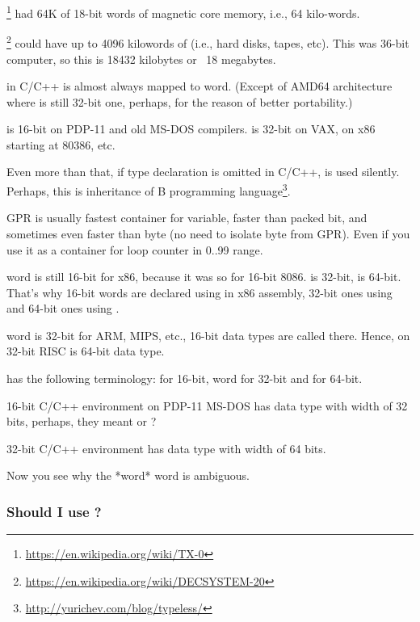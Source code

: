 \footnote{\url{https://en.wikipedia.org/wiki/TX-0}} had 64K of 18-bit words of magnetic core memory,
i.e., 64 kilo-words.

\footnote{\url{https://en.wikipedia.org/wiki/DECSYSTEM-20}}
could have up to 4096 kilowords of 
(i.e., hard disks, tapes, etc).
This was 36-bit computer, so this is 18432 kilobytes or ~18 megabytes.

\myhrule{}

 in C/C++ is almost always mapped to \gls{word}.
(Except of AMD64 architecture where  is still 32-bit one, perhaps, for the reason of better portability.)

 is 16-bit on PDP-11 and old MS-DOS compilers.
 is 32-bit on VAX, on x86 starting at 80386, etc.

Even more than that, if type declaration is omitted in C/C++,  is used silently.
Perhaps, this is inheritance of B programming language\footnote{\url{http://yurichev.com/blog/typeless/}}.

\myhrule{}

\ac{GPR} is usually fastest container for variable, faster than packed bit,
and sometimes even faster than byte (no need to isolate byte from \ac{GPR}).
Even if you use it as a container for loop counter in 0..99 range.

\myhrule{}

\Gls{word} is still 16-bit for x86, because it was so for 16-bit 8086.
 is 32-bit,  is 64-bit.
That's why 16-bit words are declared using  in x86 assembly, 32-bit ones using  and 64-bit ones using .

\Gls{word} is 32-bit for ARM, MIPS, etc., 16-bit data types are called  there.
Hence,  on 32-bit RISC is 64-bit data type.

 has the following terminology:  for 16-bit, \gls{word} for 32-bit and  for 64-bit.

16-bit C/C++ environment on PDP-11 MS-DOS has  data type with width of 32 bits, perhaps,
they meant  or ?

32-bit C/C++ environment has  data type with width of 64 bits.

Now you see why the *word* word is ambiguous.

\subsubsection{Should I use ?}

